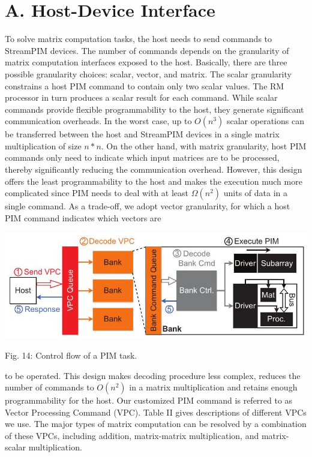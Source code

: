 \documentclass[10pt]{article}
\begin{document}
\section*{A. Host-Device Interface}
To solve matrix computation tasks, the host needs to send commands to StreamPIM devices. The number of commands depends on the granularity of matrix computation interfaces exposed to the host. Basically, there are three possible granularity choices: scalar, vector, and matrix. The scalar granularity constrains a host PIM command to contain only two scalar values. The RM processor in turn produces a scalar result for each command. While scalar commands provide flexible programmability to the host, they generate significant communication overheads. In the worst case, up to $O\left(n^{3}\right)$ scalar operations can be transferred between the host and StreamPIM devices in a single matrix multiplication of size $n * n$. On the other hand, with matrix granularity, host PIM commands only need to indicate which input matrices are to be processed, thereby significantly reducing the communication overhead. However, this design offers the least programmability to the host and makes the execution much more complicated since PIM needs to deal with at least $\Omega\left(n^{2}\right)$ units of data in a single command. As a trade-off, we adopt vector granularity, for which a host PIM command indicates which vectors are

\begin{center}
\includegraphics[max width=\textwidth]{2024_05_12_abeba8a85da5b5ec4c7bg-08(1)}
\end{center}

Fig. 14: Control flow of a PIM task.

to be operated. This design makes decoding procedure less complex, reduces the number of commands to $O\left(n^{2}\right)$ in a matrix multiplication and retains enough programmability for the host. Our customized PIM command is referred to as Vector Processing Command (VPC). Table II gives descriptions of different VPCs we use. The major types of matrix computation can be resolved by a combination of these VPCs, including addition, matrix-matrix multiplication, and matrix-scalar multiplication.
\end{document}
